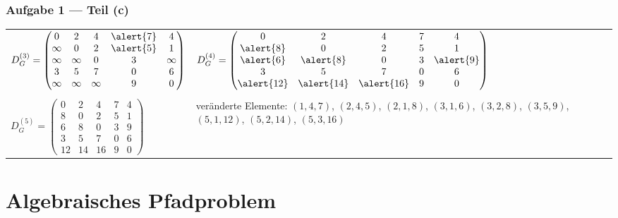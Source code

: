 \documentclass{beamer}
\begin{document}
\begin{frame} \frametitle{Aufgabe 1 --- Teil (c)}
	\begin{tabular}{m{.48\linewidth} m{.48\linewidth}}
		$D_G^{(3)} = \begin{pmatrix}
		0      & 2      & 4      & \alert{7} & 4 \\
		\infty & 0      & 2      & \alert{5} & 1 \\
		\infty & \infty & 0      & 3      & \infty \\
		3      & 5      & 7      & 0      & 6 \\
		\infty & \infty & \infty & 9      & 0
		\end{pmatrix}$
		&
		$D_G^{(4)} = \begin{pmatrix}
		0      & 2      & 4      & 7      & 4 \\
		\alert{8} & 0      & 2      & 5      & 1 \\
		\alert{6} & \alert{8} & 0      & 3      & \alert{9} \\
		3      & 5      & 7      & 0      & 6 \\
		\alert{12} & \alert{14} & \alert{16} & 9      & 0
		\end{pmatrix}$ \\ \\
		$D_G^{(5)} = \begin{pmatrix}
		0      & 2      & 4      & 7      & 4 \\
		8      & 0      & 2      & 5      & 1 \\
		6      & 8      & 0      & 3      & 9 \\
		3      & 5      & 7      & 0      & 6 \\
		12     & 14     & 16     & 9      & 0
		\end{pmatrix}$ 
		&
		veränderte Elemente:
		$(1,4,7)$, $(2,4,5)$, $(2,1,8)$, $(3,1,6)$, $(3,2,8)$, $(3,5,9)$, $(5,1,12)$, $(5,2,14)$, $(5,3,16)$ \\
	\end{tabular}
	
\end{frame}


\section{Algebraisches Pfadproblem}
\end{document}
